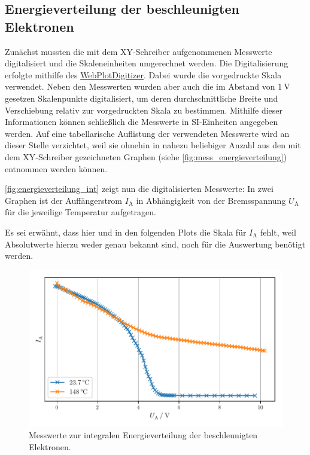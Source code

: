 \subsection{Energieverteilung der beschleunigten Elektronen}
\label{sec:auswertung:energieverteilung}

Zunächst mussten die mit dem XY-Schreiber aufgenommenen Messwerte digitalisiert
und die Skaleneinheiten umgerechnet werden.
Die Digitalisierung erfolgte mithilfe des \href{https://automeris.io/WebPlotDigitizer/}{WebPlotDigitizer}.
Dabei wurde die vorgedruckte Skala verwendet.
Neben den Messwerten wurden aber auch die im Abstand von $\SI{1}{\volt}$ gesetzen Skalenpunkte digitalisiert,
um deren durchschnittliche Breite und Verschiebung relativ zur vorgedruckten Skala zu bestimmen.
Mithilfe dieser Informationen können schließlich die Messwerte in SI-Einheiten angegeben werden.
Auf eine tabellarische Auflistung der verwendeten Messwerte wird an dieser Stelle verzichtet,
weil sie ohnehin in nahezu beliebiger Anzahl
aus den mit dem XY-Schreiber gezeichneten Graphen
(siehe \autoref{fig:mess_energieverteilung})
entnommen werden können.


\autoref{fig:energieverteilung_int} zeigt nun die digitalisierten Messwerte:
In zwei Graphen ist der Auffängerstrom $I_\text{A}$ in Abhängigkeit von der Bremsspannung $U_\text{A}$
für die jeweilige Temperatur aufgetragen.

Es sei erwähnt, dass hier und in den folgenden Plots die Skala für $I_\text{A}$ fehlt,
weil Absolutwerte hierzu weder genau bekannt sind,
noch für die Auswertung benötigt werden.

\begin{figure}[H]
    \centering
    \includegraphics[width=\textwidth]{build/plt/energieverteilung_int.pdf}
    \caption{Messwerte zur integralen Energieverteilung der beschleunigten Elektronen.}
    \label{fig:energieverteilung_int}
\end{figure}


